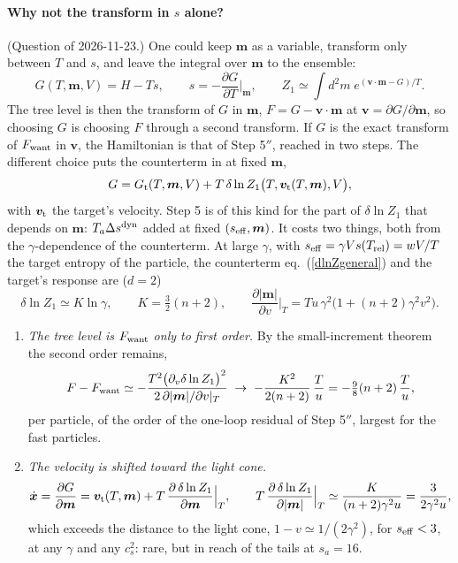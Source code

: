 \documentclass[11pt,aps,preprint,nofootinbib,superscriptaddress,tightenlines]{revtex4-2}
\def\st{\begin{equation}}
\def\stp{\end{equation}}
\def\Eq#1{eq.~(\ref{#1})}
\let\oldparagraph\paragraph
\renewcommand{\paragraph}{\par\bigskip\oldparagraph}
\begin{document}
\paragraph{Why not the transform in $s$ alone?}  (Question of 2026-11-23.)  One could keep $\bm m$ as a variable, transform only between $T$ and $s$, and leave the
integral over $\bm m$ to the ensemble:
\st
G(T,\bm m,V)=H-Ts,\qquad s=-\frac{\partial G}{\partial T}\Big|_{\bm m},\qquad
Z_1\simeq\int d^2m\;e^{(\bm v\cdot\bm m-G)/T} .
\stp
The tree level is then the transform of $G$ in $\bm m$, $F=G-\bm v\cdot\bm m$ at $\bm v=\partial G/\partial\bm m$, so choosing $G$ is choosing $F$ through a second transform.  If $G$ is the exact
transform of $F_{\rm want}$ in $\bm v$, the Hamiltonian is that of Step 5$''$, reached in two steps.  The different choice puts the counterterm in at fixed $\bm m$,
\st
G=G_{\rm t}(T,\bm m,V)+T\,\delta\ln Z_1\big(T,\bm v_{\rm t}(T,\bm m),V\big),
\stp
with $\bm v_{\rm t}$ the target's velocity.  Step 5 is of this kind for the part of $\delta\ln Z_1$ that depends on $\bm m$: $T_a\Delta s^{\rm dyn}$ added at fixed $(s_{\rm eff},\bm m)$.  It costs
two things, both from the $\gamma$-dependence of the counterterm.  At large $\gamma$, with $s_{\rm eff}=\gamma Vs(T_{\rm rel})=wV/T$ the target entropy of the particle, the
counterterm \Eq{dlnZgeneral} and the target's response are ($d=2$)
\st
\delta\ln Z_1\simeq K\ln\gamma,\qquad K=\tfrac32(n+2),\qquad
\frac{\partial|\bm m|}{\partial v}\Big|_T=Tu\,\gamma^2\big(1+(n+2)\gamma^2v^2\big) .
\stp
\begin{enumerate}
\item \emph{The tree level is $F_{\rm want}$ only to first order.}  By the small-increment theorem the second order remains,
  \st
  F-F_{\rm want}\simeq-\frac{T^2\big(\partial_v\delta\ln Z_1\big)^2}{2\,\partial|\bm m|/\partial v|_T}\;\to\;-\frac{K^2}{2(n+2)}\,\frac Tu=-\tfrac98(n+2)\,\frac Tu ,
  \stp
  per particle, of the order of the one-loop residual of Step 5$''$, largest for the fast particles.
\item \emph{The velocity is shifted toward the light cone.}
  \st
  \dot{\bm x}=\frac{\partial G}{\partial\bm m}=\bm v_{\rm t}(T,\bm m)+T\,\frac{\partial\,\delta\ln Z_1}{\partial\bm m}\Big|_T,\qquad
  T\,\frac{\partial\,\delta\ln Z_1}{\partial|\bm m|}\Big|_T\simeq\frac{K}{(n+2)\gamma^2u}=\frac{3}{2\gamma^2u} ,
  \stp
  which exceeds the distance to the light cone, $1-v\simeq1/(2\gamma^2)$, for $s_{\rm eff}<3$, at any $\gamma$ and any $c_s^2$: rare, but in reach of the tails at $s_a=16$.
\end{enumerate}
\end{document}
